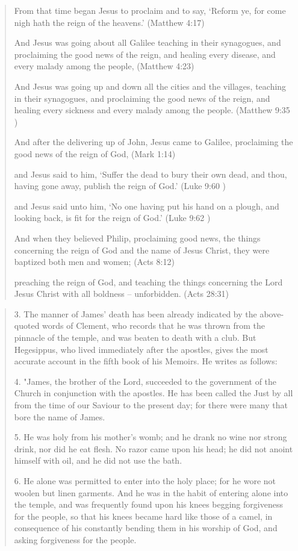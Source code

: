 \documentclass[11pt]{article}
\begin{document}
\begin{thebibliography}{37}
\begin{quote}
From that time began Jesus to proclaim and to say, `Reform ye, for come nigh hath the reign of the heavens.'
(Matthew 4:17)

And Jesus was going about all Galilee teaching in their synagogues, and proclaiming the good news of the reign, and healing every disease, and every malady among the people,
(Matthew 4:23)

And Jesus was going up and down all the cities and the villages, teaching in their synagogues, and proclaiming the good news of the reign, and healing every sickness and every malady among the people.
 (Matthew 9:35 )

And after the delivering up of John, Jesus came to Galilee, proclaiming the good news of the reign of God,
 (Mark 1:14)

and Jesus said to him, `Suffer the dead to bury their own dead, and thou, having gone away, publish the reign of God.'
 (Luke 9:60 )

and Jesus said unto him, `No one having put his hand on a plough, and looking back, is fit for the reign of God.'
 (Luke 9:62 )

And when they believed Philip, proclaiming good news, the things concerning the reign of God and the name of Jesus Christ, they were baptized both men and women;
 (Acts 8:12)

preaching the reign of God, and teaching the things concerning the Lord Jesus Christ with all boldness -- unforbidden. (Acts 28:31)
\end{quote}
\begin{quote}
3. The manner of James' death has been already indicated by the above-quoted words of Clement, who records that he was thrown from the pinnacle of the temple, and was beaten to death with a club. But Hegesippus, who lived immediately after the apostles, gives the most accurate account in the fifth book of his Memoirs. He writes as follows:

4. "James, the brother of the Lord, succeeded to the government of the Church in conjunction with the apostles. He has been called the Just by all from the time of our Saviour to the present day; for there were many that bore the name of James.

5. He was holy from his mother's womb; and he drank no wine nor strong drink, nor did he eat flesh. No razor came upon his head; he did not anoint himself with oil, and he did not use the bath.

6. He alone was permitted to enter into the holy place; for he wore not woolen but linen garments. And he was in the habit of entering alone into the temple, and was frequently found upon his knees begging forgiveness for the people, so that his knees became hard like those of a camel, in consequence of his constantly bending them in his worship of God, and asking forgiveness for the people. 


\end{quote}
\end{thebibliography}
\end{document}
